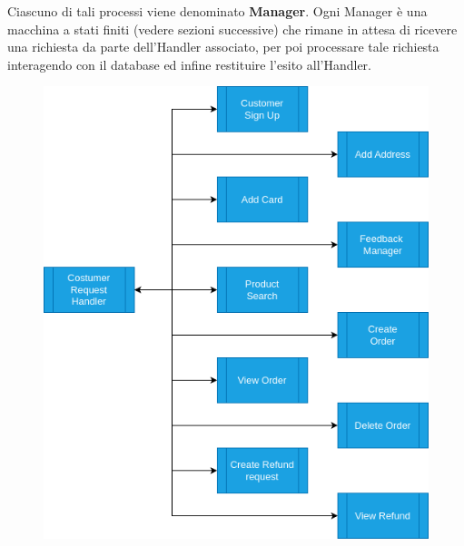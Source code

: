 \documentclass[12pt]{report}
\begin{document}
    \newpage
    
    Ciascuno di tali processi viene denominato \textbf{Manager}. Ogni Manager è una macchina a stati finiti (vedere sezioni successive) che rimane in attesa di ricevere una richiesta da parte dell'Handler associato, per poi processare tale richiesta interagendo con il database ed infine restituire l'esito all'Handler.
    
    \begin{figure}[H]
        \centering
        \includegraphics[scale=0.6]{images/System Architecture 1.png}
        
        \label{fig:Manager_architecture_1}
    \end{figure}
    
\end{document}
